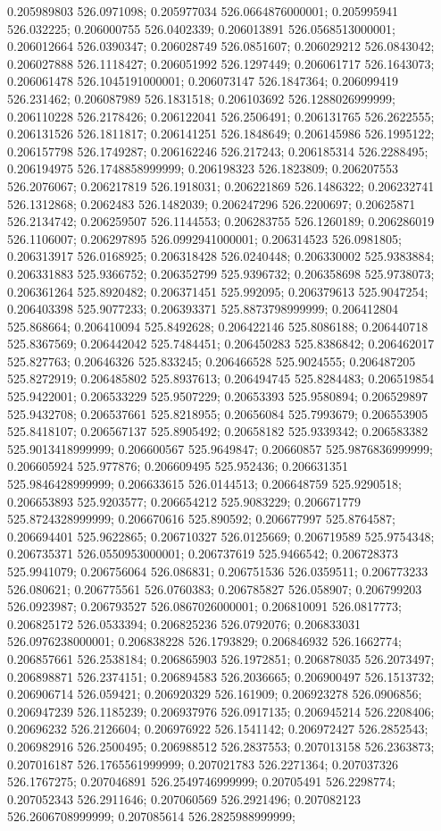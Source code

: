 0.205989803 526.0971098; 0.205977034 526.0664876000001; 0.205995941 526.032225; 0.206000755 526.0402339; 0.206013891 526.0568513000001; 0.206012664 526.0390347; 0.206028749 526.0851607; 0.206029212 526.0843042; 0.206027888 526.1118427; 0.206051992 526.1297449; 0.206061717 526.1643073; 0.206061478 526.1045191000001; 0.206073147 526.1847364; 0.206099419 526.231462; 0.206087989 526.1831518; 0.206103692 526.1288026999999; 0.206110228 526.2178426; 0.206122041 526.2506491; 0.206131765 526.2622555; 0.206131526 526.1811817; 0.206141251 526.1848649; 0.206145986 526.1995122; 0.206157798 526.1749287; 0.206162246 526.217243; 0.206185314 526.2288495; 0.206194975 526.1748858999999; 0.206198323 526.1823809; 0.206207553 526.2076067; 0.206217819 526.1918031; 0.206221869 526.1486322; 0.206232741 526.1312868; 0.2062483 526.1482039; 0.206247296 526.2200697; 0.20625871 526.2134742; 0.206259507 526.1144553; 0.206283755 526.1260189; 0.206286019 526.1106007; 0.206297895 526.0992941000001; 0.206314523 526.0981805; 0.206313917 526.0168925; 0.206318428 526.0240448; 0.206330002 525.9383884; 0.206331883 525.9366752; 0.206352799 525.9396732; 0.206358698 525.9738073; 0.206361264 525.8920482; 0.206371451 525.992095; 0.206379613 525.9047254; 0.206403398 525.9077233; 0.206393371 525.8873798999999; 0.206412804 525.868664; 0.206410094 525.8492628; 0.206422146 525.8086188; 0.206440718 525.8367569; 0.206442042 525.7484451; 0.206450283 525.8386842; 0.206462017 525.827763; 0.20646326 525.833245; 0.206466528 525.9024555; 0.206487205 525.8272919; 0.206485802 525.8937613; 0.206494745 525.8284483; 0.206519854 525.9422001; 0.206533229 525.9507229; 0.20653393 525.9580894; 0.206529897 525.9432708; 0.206537661 525.8218955; 0.20656084 525.7993679; 0.206553905 525.8418107; 0.206567137 525.8905492; 0.20658182 525.9339342; 0.206583382 525.9013418999999; 0.206600567 525.9649847; 0.20660857 525.9876836999999; 0.206605924 525.977876; 0.206609495 525.952436; 0.206631351 525.9846428999999; 0.206633615 526.0144513; 0.206648759 525.9290518; 0.206653893 525.9203577; 0.206654212 525.9083229; 0.206671779 525.8724328999999; 0.206670616 525.890592; 0.206677997 525.8764587; 0.206694401 525.9622865; 0.206710327 526.0125669; 0.206719589 525.9754348; 0.206735371 526.0550953000001; 0.206737619 525.9466542; 0.206728373 525.9941079; 0.206756064 526.086831; 0.206751536 526.0359511; 0.206773233 526.080621; 0.206775561 526.0760383; 0.206785827 526.058907; 0.206799203 526.0923987; 0.206793527 526.0867026000001; 0.206810091 526.0817773; 0.206825172 526.0533394; 0.206825236 526.0792076; 0.206833031 526.0976238000001; 0.206838228 526.1793829; 0.206846932 526.1662774; 0.206857661 526.2538184; 0.206865903 526.1972851; 0.206878035 526.2073497; 0.206898871 526.2374151; 0.206894583 526.2036665; 0.206900497 526.1513732; 0.206906714 526.059421; 0.206920329 526.161909; 0.206923278 526.0906856; 0.206947239 526.1185239; 0.206937976 526.0917135; 0.206945214 526.2208406; 0.20696232 526.2126604; 0.206976922 526.1541142; 0.206972427 526.2852543; 0.206982916 526.2500495; 0.206988512 526.2837553; 0.207013158 526.2363873; 0.207016187 526.1765561999999; 0.207021783 526.2271364; 0.207037326 526.1767275; 0.207046891 526.2549746999999; 0.20705491 526.2298774; 0.207052343 526.2911646; 0.207060569 526.2921496; 0.207082123 526.2606708999999; 0.207085614 526.2825988999999; 
